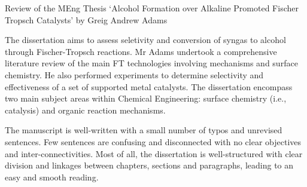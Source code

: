 \documentclass[14pt,twoside]{report}
\begin{document}
\vfill
\clearpage




\bigskip

\begin{center}
  {\Large Review of the MEng Thesis `Alcohol Formation over Alkaline Promoted Fischer Tropsch Catalysts' by Greig Andrew Adams}
\end{center}
The dissertation aims to assess seletivity and conversion of syngas to alcohol through Fischer-Tropsch reactions. Mr Adams undertook a comprehensive literature review of the main FT technologies involving mechanisms and surface chemistry. He also performed experiments to determine selectivity and effectiveness of a set of supported metal catalysts. The dissertation encompass two main subject areas within Chemical Engineering: surface chemistry (i.e., catalysis) and organic reaction mechanisms.

The manuscript is well-written with a small number of typos and unrevised sentences. Few sentences are confusing and disconnected with no clear objectives and inter-connectivities. Most of all, the dissertation is well-structured with clear division and linkages between chapters, sections and paragraphs, leading to an easy and smooth reading.
\end{document}
